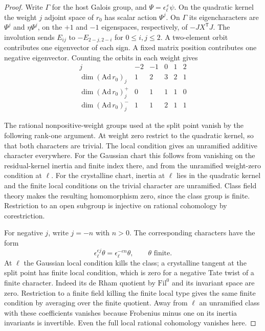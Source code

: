 \begin{proof}
Write \(\Gamma\) for the host Galois group, and
\(\Psi=\epsilon_\ell^{\,e}\psi\). On the quadratic kernel
the weight \(j\) adjoint space of \(r_0\) has scalar action
\(\Psi^j\). On \(\Gamma\) its eigencharacters are
\(\Psi^j\) and \(\eta\Psi^j\), on the \(+1\) and \(-1\)
eigenspaces, respectively, of \(-JX^{\mathsf T}J\).
The involution sends \(E_{ij}\) to \(-E_{2-j,2-i}\) for \(0\le i,j\le2\). A two-element orbit contributes one eigenvector of each sign. A fixed matrix position contributes one negative eigenvector. Counting the orbits in each weight gives
\[
 \begin{array}{c|rrrrr}
 j&-2&-1&0&1&2\\ \hline
 \dim (\mathrm{Ad}\,r_0)_j&1&2&3&2&1\\
 \dim (\mathrm{Ad}\,r_0)_j^{+}&0&1&1&1&0\\
 \dim (\mathrm{Ad}\,r_0)_j^{-}&1&1&2&1&1
 \end{array}
\]

The rational nonpositive-weight groups used at the split
point vanish by the following rank-one argument. At
weight zero restrict to the quadratic kernel, so that
both characters are trivial. The local condition gives
an unramified additive character everywhere. For the
Gaussian chart this follows from vanishing on the
residual-kernel inertia and finite index there, and
from the unramified weight-zero condition at \(\ell\).
For the crystalline chart, inertia at \(\ell\) lies in
the quadratic kernel and the finite local conditions on
the trivial character are unramified. Class field theory
makes the resulting homomorphism zero, since the class
group is finite. Restriction to an open subgroup is
injective on rational cohomology by corestriction.

For negative \(j\), write \(j=-n\) with \(n>0\). The corresponding characters have the form
\[
 \epsilon_\ell^{ej}\theta=\epsilon_\ell^{-en}\theta,\qquad\theta\text{ finite}.
\]
At \(\ell\) the Gaussian local condition kills the class;
a crystalline tangent at the split point has finite local
condition, which is zero for a negative Tate twist of a
finite character. Indeed its de Rham quotient by
\(\mathrm{Fil}^0\) and its invariant space are zero.
Restriction to a finite field killing the finite local
type gives the same finite condition by averaging over
the finite quotient. Away from \(\ell\) an unramified
class with these coefficients vanishes because Frobenius
minus one on its inertia invariants is invertible. Even the full local rational cohomology vanishes here.


\end{proof}
